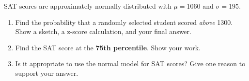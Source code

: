 \documentclass[10pt]{article}
\begin{document}
\namedateperiod

\vspace{0.15in}

SAT scores are approximately normally distributed with $\mu = 1060$ and $\sigma = 195$.

\begin{enumerate}
  \item Find the probability that a randomly selected student scored \emph{above} 1300.
        Show a sketch, a z-score calculation, and your final answer.

        \vspace{1.5in}

  \item Find the SAT score at the \textbf{75th percentile}. Show your work.

        \vspace{1.2in}

  \item Is it appropriate to use the normal model for SAT scores? Give one reason to
        support your answer.

\end{enumerate}
\end{document}
